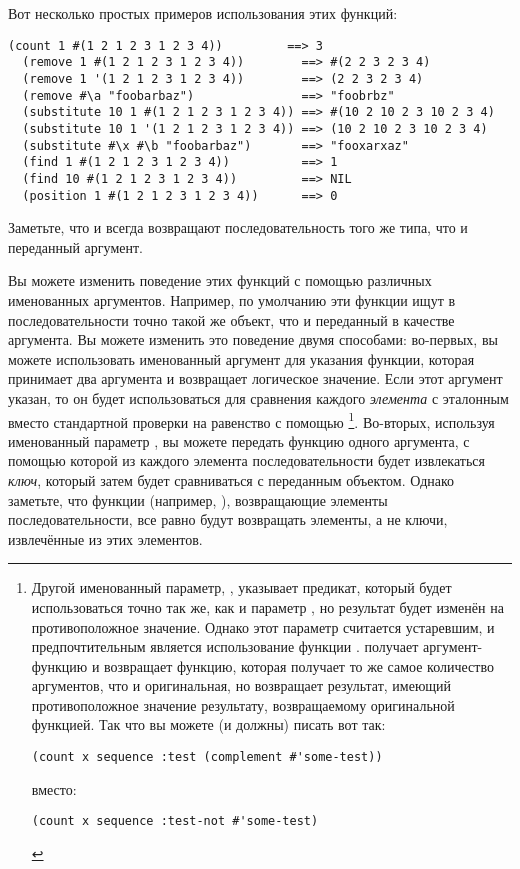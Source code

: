 Вот несколько простых примеров использования этих функций:

\begin{lstlisting}[style=lisprepl]
  (count 1 #(1 2 1 2 3 1 2 3 4))         ==> 3
  (remove 1 #(1 2 1 2 3 1 2 3 4))        ==> #(2 2 3 2 3 4)
  (remove 1 '(1 2 1 2 3 1 2 3 4))        ==> (2 2 3 2 3 4)
  (remove #\a "foobarbaz")               ==> "foobrbz"
  (substitute 10 1 #(1 2 1 2 3 1 2 3 4)) ==> #(10 2 10 2 3 10 2 3 4)
  (substitute 10 1 '(1 2 1 2 3 1 2 3 4)) ==> (10 2 10 2 3 10 2 3 4)
  (substitute #\x #\b "foobarbaz")       ==> "fooxarxaz"
  (find 1 #(1 2 1 2 3 1 2 3 4))          ==> 1
  (find 10 #(1 2 1 2 3 1 2 3 4))         ==> NIL
  (position 1 #(1 2 1 2 3 1 2 3 4))      ==> 0
\end{lstlisting}

Заметьте, что  и  всегда возвращают последовательность
того же типа, что и переданный аргумент.

Вы можете изменить поведение этих функций с помощью различных именованных аргументов.
Например, по умолчанию эти функции ищут в последовательности точно такой же объект, что и
переданный в качестве аргумента.  Вы можете изменить это поведение двумя способами: во-первых,
вы можете использовать именованный аргумент  для указания функции,
которая принимает два аргумента и возвращает логическое значение.  Если этот аргумент
указан, то он будет использоваться для сравнения каждого \textit{элемента} с эталонным вместо стандартной
проверки на равенство с помощью \footnote{Другой именованный параметр,
  , указывает предикат, который будет использоваться точно так же, как и
  параметр , но результат будет изменён на
  противоположное значение.  Однако этот параметр считается устаревшим, и предпочтительным
  является использование функции .   получает
  аргумент-функцию и возвращает функцию, которая получает то же самое количество
  аргументов, что и оригинальная, но возвращает результат, имеющий противоположное
  значение результату, возвращаемому оригинальной функцией.  Так что вы можете (и должны)
  писать вот так:

\begin{lstlisting}[style=lisprepl]
  (count x sequence :test (complement #'some-test))
\end{lstlisting}

\noindent{}вместо:

\begin{lstlisting}[style=lisprepl]
  (count x sequence :test-not #'some-test)
\end{lstlisting}

}. Во-вторых, используя именованный параметр , вы можете передать функцию одного
аргумента, с помощью которой из каждого элемента последовательности будет извлекаться \textit{ключ},
который затем будет сравниваться с переданным объектом.  Однако заметьте, что
функции (например, ), возвращающие элементы последовательности, все равно будут
возвращать элементы, а не ключи, извлечённые из этих элементов.

